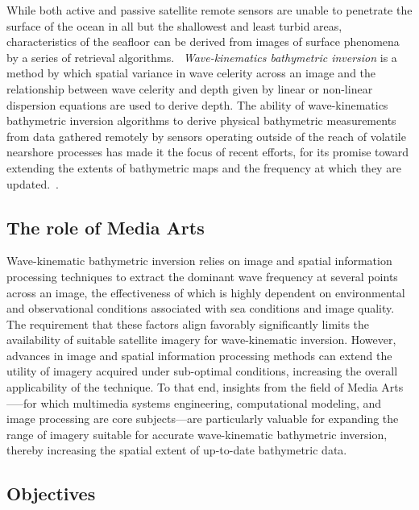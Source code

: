 \documentclass[12pt]{article}
\begin{document}
While both active and passive satellite remote sensors are unable to penetrate the surface of the ocean in all but the shallowest and least turbid areas, characteristics of the seafloor can be derived from images of surface phenomena by a series of retrieval algorithms.~\cite{Holman2013, Reithmeier2025} \textit{Wave-kinematics bathymetric inversion} is a method by which spatial variance in wave celerity across an image and the relationship between wave celerity and depth given by linear or non-linear dispersion equations are used to derive depth. The ability of wave-kinematics bathymetric inversion algorithms to derive physical bathymetric measurements from data gathered remotely by sensors operating outside of the reach of volatile nearshore processes has made it the focus of recent efforts, for its promise toward extending the extents of bathymetric maps and the frequency at which they are updated.~\cite{ODea2025}. 

\subsection{The role of Media Arts}
Wave-kinematic bathymetric inversion relies on image and spatial information processing techniques to extract the dominant wave frequency at several points across an image, the effectiveness of which is highly dependent on environmental and observational conditions associated with sea conditions and image quality.~\cite{VanDongeren2008, Mudiyanselage2024} The requirement that these factors align favorably significantly limits the availability of suitable satellite imagery for wave-kinematic inversion. However, advances in image and spatial information processing methods can extend the utility of imagery acquired under sub-optimal conditions, increasing the overall applicability of the technique. To that end, insights from the field of Media Arts—--for which multimedia systems engineering, computational modeling, and image processing are core subjects---are particularly valuable for expanding the range of imagery suitable for accurate wave-kinematic bathymetric inversion, thereby increasing the spatial extent of up-to-date bathymetric data.

\subsection{Objectives}
\end{document}
